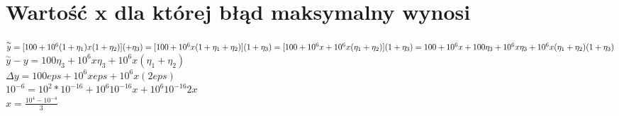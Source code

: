 \documentclass{article}
\begin{document}
\section{Wartość x dla której błąd maksymalny wynosi}
$\overset{\sim}{y}=[100+10^6(1+\eta_1)x(1+\eta_2)](+\eta_3)=[100+10^6x(1+\eta_1+\eta_2)](1+\eta_3)=[100+10^6x+10^6x(\eta_1+\eta_2)](1+\eta_3)=100+10^6x+100\eta_3+10^6x\eta_3+10^6x(\eta_1+\eta_2)(1+\eta_3)\\$
$\overset{\sim}{y}-y=100\eta_3+10^6x\eta_3+10^6x(\eta_1+\eta_2)$\\
$\Delta y=100eps+10^6xeps+10^6x(2eps)$\\
$10^{-6}=10^2*10^{-16}+10^6 10^{-16}x+10^6 10^{-16}2x$\\
$x=\frac{10^4-10^{-4}}{3}$

\end{document}
